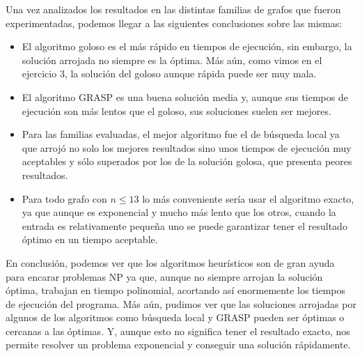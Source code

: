 Una vez analizados los resultados en las distintas familias de grafos que fueron experimentadas, podemos llegar a las siguientes conclusiones sobre las mismas:

\begin{itemize}

\item El algoritmo goloso es el más rápido en tiempos de ejecución, sin embargo, la solución arrojada no siempre es la óptima. Más aún, como vimos en el ejercicio 3, la solución del goloso aunque rápida puede ser muy mala.

\item El algoritmo GRASP es una buena solución media y, aunque sus tiempos de ejecución son más lentos que el goloso, sus soluciones suelen ser mejores.

\item Para las familias evaluadas, el mejor algoritmo fue el de búsqueda local ya que arrojó no solo los mejores resultados sino unos tiempos de ejecución muy aceptables y sólo superados por los de la solución golosa, que presenta peores resultados.

\item Para todo grafo con $n \leq 13$ lo más conveniente sería usar el algoritmo exacto, ya que aunque es exponencial y mucho más lento que los otros, cuando la entrada es relativamente pequeña uno se puede garantizar tener el resultado óptimo en un tiempo aceptable.

\end{itemize}

En conclusión, podemos ver que los algoritmos heurísticos son de gran ayuda para encarar problemas NP ya que, aunque no siempre arrojan la solución óptima, trabajan en tiempo polinomial, acortando así enormemente los tiempos de ejecución del programa. Más aún, pudimos ver que las soluciones arrojadas por algunos de los algoritmos como búsqueda local y GRASP pueden ser óptimas o cercanas a las óptimas. Y, aunque esto no significa tener el resultado exacto, nos permite resolver un problema exponencial y conseguir una solución rápidamente.
